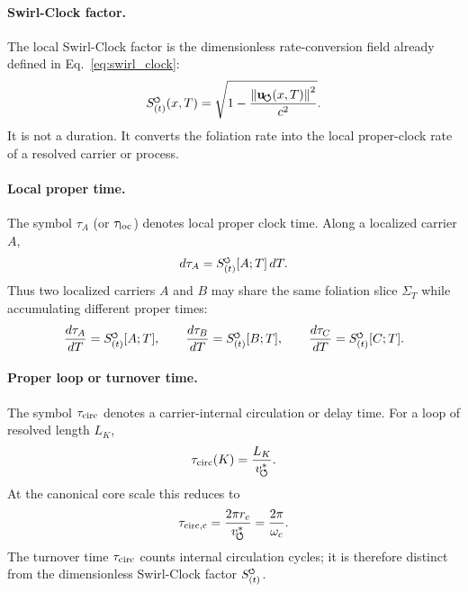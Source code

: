 \documentclass[11pt]{article}
\theoremstyle{definition}
\theoremstyle{plain}
\theoremstyle{remark}
\newcommand{\swirlarrow}{\mathchoice{\mkern-2mu\scriptstyle\boldsymbol{\circlearrowleft}}{\mkern-2mu\scriptstyle\boldsymbol{\circlearrowleft}}{\mkern-2mu\scriptscriptstyle\boldsymbol{\circlearrowleft}}{\mkern-2mu\scriptscriptstyle\boldsymbol{\circlearrowleft}}}
\newcommand{\SwirlClock}{{S_{(t)}^{\swirlarrow}}}
\newcommand{\rc}{{r_c}}
\newcommand{\vchar}{v_{\!\boldsymbol{\circlearrowleft}}^{\ast}}
\newcommand{\uswirl}{\mathbf{u}_{\!\boldsymbol{\circlearrowleft}}}
\begin{document}
        \paragraph{Swirl-Clock factor.}
        The local Swirl-Clock factor is the dimensionless rate-conversion field
        already defined in Eq.~\eqref{eq:swirl_clock}:
        \begin{align}
            \SwirlClock(x,T)
            =
            \sqrt{
                1
                -
                \frac{
                    \left\|
                    \uswirl(x,T)
                    \right\|^2
                }{c^2}
            } .
            \label{eq:canonical_time_ontology_swirl_clock}
        \end{align}
        It is not a duration.  It converts the foliation rate into the local
        proper-clock rate of a resolved carrier or process.

        \paragraph{Local proper time.}
        The symbol \(\tau_A\) (or \(\tau_{\rm loc}\)) denotes local proper clock time.  Along a localized
        carrier \(A\),
        \begin{align}
            d\tau_A
            =
            \SwirlClock[A;T]\,dT .
            \label{eq:canonical_time_ontology_local_tau}
        \end{align}
        Thus two localized carriers \(A\) and \(B\) may share the same foliation
        slice \(\Sigma_T\) while accumulating different proper times:
        \begin{align}
            \frac{d\tau_A}{dT}=\SwirlClock[A;T],
            \qquad
            \frac{d\tau_B}{dT}=\SwirlClock[B;T],
            \qquad
            \frac{d\tau_C}{dT}=\SwirlClock[C;T].
            \label{eq:absolute_T_local_tau_layers}
        \end{align}

        \paragraph{Proper loop or turnover time.}
        The symbol \(\tau_{\rm circ}\) denotes a carrier-internal circulation or
        delay time.  For a loop of resolved length \(L_K\),
        \begin{align}
            \tau_{\rm circ}(K)
            =
            \frac{L_K}{\vchar}.
            \label{eq:canonical_time_ontology_loop_time}
        \end{align}
        At the canonical core scale this reduces to
        \begin{align}
            \tau_{\rm circ,c}
            =
            \frac{2\pi \rc}{\vchar}
            =
            \frac{2\pi}{\omega_c}.
        \end{align}
        The turnover time \(\tau_{\rm circ}\) counts internal circulation cycles; it is
        therefore distinct from the dimensionless Swirl-Clock factor \(\SwirlClock\).
\end{document}
